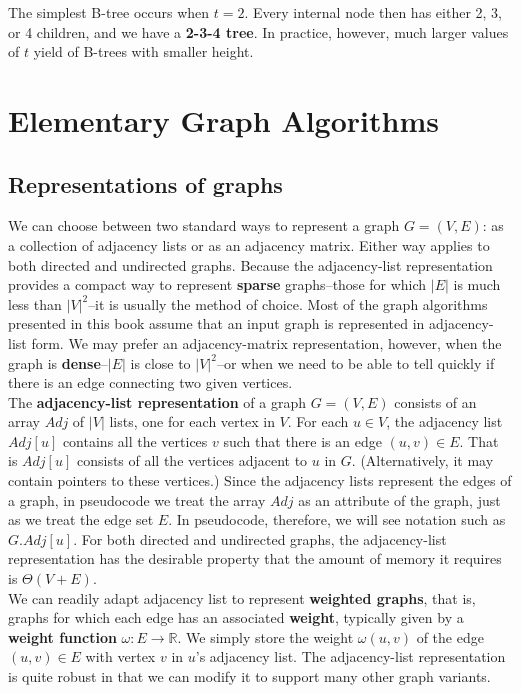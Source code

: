 \documentclass[12pt]{article}
\begin{document}
The simplest B-tree occurs when $t=2$. Every internal node then has either 2, 3, or 4 children, and we have a \textbf{2-3-4 tree}. In practice, however, much larger values of $t$ yield of B-trees with smaller height.

\section{Elementary Graph Algorithms}

\subsection{Representations of graphs}

We can choose between two standard ways to represent a graph $G = (V,E)$: as a collection of adjacency lists or as an adjacency matrix. Either way applies to both directed and undirected graphs. Because the adjacency-list representation provides a compact way to represent \textbf{sparse} graphs--those for which $|E|$ is much less than $|V|^2$--it is usually the method of choice. Most of the graph algorithms presented in this book assume that an input graph is represented in adjacency-list form. We may prefer an adjacency-matrix representation, however, when the graph is \textbf{dense}--$|E|$ is close to $|V|^2$--or when we need to be able to tell quickly if there is an edge connecting two given vertices. \\

The \textbf{adjacency-list representation} of a graph $G = (V,E)$ consists of an array $Adj$ of $|V|$ lists, one for each vertex in $V$. For each $u \in V$, the adjacency list $Adj[u]$ contains all the vertices $v$ such that there is an edge $(u,v) \in E$. That is $Adj[u]$ consists of all the vertices adjacent to $u$ in $G$. (Alternatively, it may contain pointers to these vertices.) Since the adjacency lists represent the edges of a graph, in pseudocode we treat the array $Adj$ as an attribute of the graph, just as we treat the edge set $E$. In pseudocode, therefore, we will see notation such as $G.Adj[u]$. For both directed and undirected graphs, the adjacency-list representation has the desirable property that the amount of memory it requires is $\Theta (V+E)$. \\

We can readily adapt adjacency list to represent \textbf{weighted graphs}, that is, graphs for which each edge has an associated \textbf{weight}, typically given by a \textbf{weight function} $\omega : E \rightarrow \mathbb{
R}$. We simply store the weight $\omega(u,v)$ of the edge $(u,v) \in E$ with vertex $v$ in $u$'s adjacency list. The adjacency-list representation is quite robust in that we can modify it to support many other graph variants. \\
\end{document}
